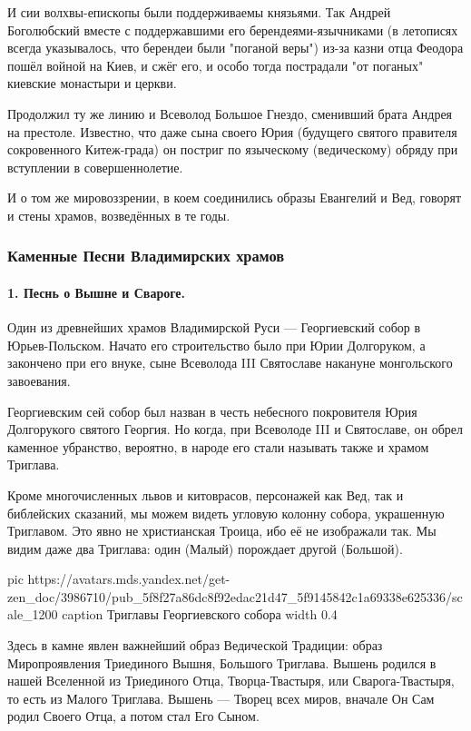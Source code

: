 И сии волхвы-епископы были поддерживаемы князьями. Так Андрей Боголюбский
вместе с поддержавшими его берендеями-язычниками (в летописях всегда
указывалось, что берендеи были "поганой веры") из-за казни отца Феодора пошёл
войной на Киев, и сжёг его, и особо тогда пострадали "от поганых" киевские
монастыри и церкви.

Продолжил ту же линию и Всеволод Большое Гнездо, сменивший брата Андрея на
престоле. Известно, что даже сына своего Юрия (будущего святого правителя
сокровенного Китеж-града) он постриг по языческому (ведическому) обряду при
вступлении в совершеннолетие.

И о том же мировоззрении, в коем соединились образы Евангелий и Вед, говорят и
стены храмов, возведённых в те годы.  

\subsubsection{Каменные Песни Владимирских храмов}

\paragraph{1. Песнь о Вышне и Свароге.}

Один из древнейших храмов Владимирской Руси — Георгиевский собор в
Юрьев-Польском. Начато его строительство было при Юрии Долгоруком, а закончено
при его внуке, сыне Всеволода III Святославе накануне монгольского завоевания.

Георгиевским сей собор был назван в честь небесного покровителя Юрия
Долгорукого святого Георгия. Но когда, при Всеволоде III и Святославе, он обрел
каменное убранство, вероятно, в народе его стали называть также и храмом
Триглава.

Кроме многочисленных львов и китоврасов, персонажей как Вед, так и библейских
сказаний, мы можем видеть угловую колонну собора, украшенную Триглавом. Это
явно не христианская Троица, ибо её не изображали так. Мы видим даже два
Триглава: один (Малый) порождает другой (Большой).

\ifcmt
pic https://avatars.mds.yandex.net/get-zen_doc/3986710/pub_5f8f27a86dc8f92edac21d47_5f9145842c1a69338e625336/scale_1200
caption Триглавы Георгиевского собора
width 0.4
\fi

Здесь в камне явлен важнейший образ Ведической Традиции: образ Миропроявления
Триединого Вышня, Большого Триглава. Вышень родился в нашей Вселенной из
Триединого Отца, Творца-Твастыря, или Сварога-Твастыря, то есть из Малого
Триглава. Вышень — Творец всех миров, вначале Он Сам родил Своего Отца, а потом
стал Его Сыном.

